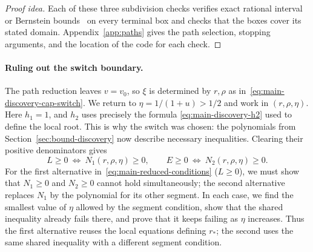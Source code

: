 \documentclass[11pt]{article}
\theoremstyle{remark}
\theoremstyle{plain}
\begin{document}
\begin{proof}[Proof idea]
Each of these three subdivision checks verifies exact rational
interval or Bernstein bounds~\cite{moore2009,garloff1986} on every
terminal box and checks that the boxes cover its stated domain.
Appendix~\ref{app:paths} gives the path selection, stopping arguments,
and the location of the code for each check.
\end{proof}

\paragraph{Ruling out the switch boundary.}
The path reduction leaves $v=v_0$, so $\xi$ is determined by
$r,\rho$ as in~\eqref{eq:main-discovery-cap-switch}.
We return to $\eta=1/(1+u)>1/2$ and work in $(r,\rho,\eta)$.
Here $h_1=1$, and $h_2$ uses precisely the formula
\eqref{eq:main-discovery-h2} used to define the local root.
This is why the switch was chosen: the polynomials from
Section~\ref{sec:bound-discovery} now describe necessary
inequalities. Clearing their positive denominators gives
\begin{equation}
 L\ge0\ \Longleftrightarrow\ N_1(r,\rho,\eta)\ge0,\qquad
 E\ge0\ \Longleftrightarrow\ N_2(r,\rho,\eta)\ge0.
 \label{eq:main-switch-polynomial-conditions}
\end{equation}
For the first alternative in~\eqref{eq:main-reduced-conditions}
($L\ge0$), we must show that $N_1\ge0$ and $N_2\ge0$ cannot hold
simultaneously; the second alternative replaces $N_1$ by the
polynomial for its other segment. In each case, we find the smallest
value of $\eta$ allowed by the segment condition, show that the
shared inequality already fails there, and prove that it keeps
failing as $\eta$ increases. Thus the first alternative reuses the local
equations defining $r_*$; the second uses the same shared inequality
with a different segment condition.
\end{document}
